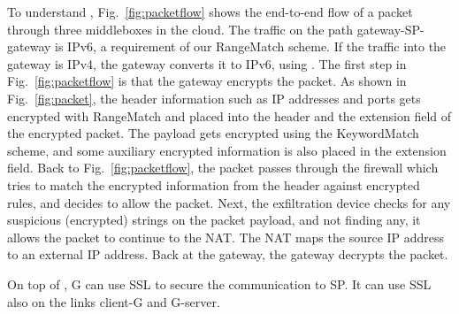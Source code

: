 To understand \sys, Fig.~\ref{fig:packetflow} shows the end-to-end flow of a packet through three middleboxes in the cloud. The traffic on the path gateway-SP-gateway is IPv6, a requirement of our RangeMatch scheme. If the traffic into the gateway is IPv4, the gateway converts it to IPv6, using . The first step in Fig.~\ref{fig:packetflow} is that the gateway encrypts the packet. As shown in Fig.~\ref{fig:packet}, the header information such as IP addresses and ports gets encrypted with RangeMatch and placed into the header and the extension field of the encrypted packet. The payload gets encrypted using the KeywordMatch scheme, and some auxiliary encrypted information is also placed in the extension field. Back to Fig.~\ref{fig:packetflow}, the packet passes through the firewall which tries to match the encrypted information from the header against  encrypted rules, and decides to allow the packet. Next, the exfiltration device checks for any suspicious (encrypted) strings on the packet payload, and not finding any, it allows the packet  to continue to the NAT. The NAT maps the source IP address to an external IP address. Back at the gateway, the gateway decrypts the packet. 

On top of \sys, G can use SSL  to secure the communication to SP.  It can use SSL also on the links client-G and G-server.



